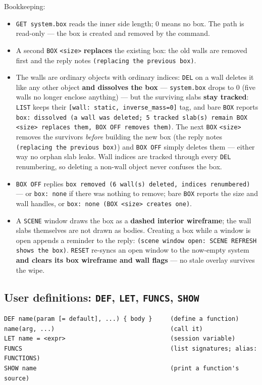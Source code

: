 \documentclass[11pt]{article}
\newcommand{\kw}[1]{\texttt{\uppercase{#1}}}
\newcommand{\code}[1]{\texttt{#1}}
\begin{document}
Bookkeeping:
\begin{itemize}
\item \code{GET system.box} reads the inner side length; 0 means no
      box. The path is read-only --- the box is created and removed by
      the command.
\item A second \kw{box} \code{<size>} \textbf{replaces} the existing
      box: the old walls are removed first and the reply notes
      \code{(replacing the previous box)}.
\item The walls are ordinary objects with ordinary indices: \kw{del}
      on a wall deletes it like any other object \textbf{and dissolves
      the box} --- \code{system.box} drops to 0 (five walls no longer
      enclose anything) --- but the surviving slabs \textbf{stay
      tracked}: \kw{list} keeps their
      \code{[wall: static, inverse\_mass=0]} tag, and bare \kw{box}
      reports \code{box: dissolved (a wall was deleted; 5 tracked
      slab(s) remain \textemdash{} BOX <size> replaces them, BOX OFF
      removes them)}. The next \kw{box} \code{<size>} removes the
      survivors \emph{before} building the new box (the reply notes
      \code{(replacing the previous box)}) and \kw{box off} simply
      deletes them --- either way no orphan slab leaks. Wall indices
      are tracked through every \kw{del} renumbering, so deleting a
      non-wall object never confuses the box.
\item \kw{box off} replies \code{box removed (6 wall(s) deleted,
      indices renumbered)} --- or \code{box: none} if there was
      nothing to remove; bare \kw{box} reports the size and wall
      handles, or \code{box: none (BOX <size> creates one)}.
\item A \kw{scene} window draws the box as a \textbf{dashed interior
      wireframe}; the wall slabs themselves are not drawn as bodies.
      Creating a box while a window is open appends a reminder to the
      reply: \code{(scene window open: SCENE REFRESH shows the box)}.
      \kw{reset} re-syncs an open window to the now-empty system
      \textbf{and clears its box wireframe and wall flags} --- no
      stale overlay survives the wipe.
\end{itemize}

\subsection{User definitions: \kw{def}, \kw{let}, \kw{funcs}, \kw{show}}
\label{sec:userdefs}

\begin{lstlisting}
DEF name(param [= default], ...) { body }     (define a function)
name(arg, ...)                                (call it)
LET name = <expr>                             (session variable)
FUNCS                                         (list signatures; alias: FUNCTIONS)
SHOW name                                     (print a function's source)
\end{lstlisting}
\end{document}
